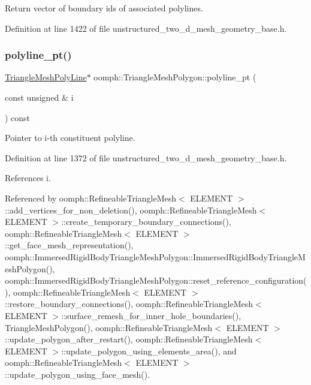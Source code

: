 Return vector of boundary ids of associated polylines. 



Definition at line 1422 of file unstructured\+\_\+two\+\_\+d\+\_\+mesh\+\_\+geometry\+\_\+base.\+h.

\mbox{\label{classoomph_1_1TriangleMeshPolygon_a528399d7e0fe0c8d684b4f851ca08dde}} 
\subsubsection{\texorpdfstring{polyline\+\_\+pt()}{polyline\_pt()}\hspace{0.1cm}{\footnotesize\ttfamily [1/2]}}
{\footnotesize\ttfamily \hyperlink{classoomph_1_1TriangleMeshPolyLine}{Triangle\+Mesh\+Poly\+Line}$\ast$ oomph\+::\+Triangle\+Mesh\+Polygon\+::polyline\+\_\+pt (\begin{DoxyParamCaption}\item[{const unsigned \&}]{i }\end{DoxyParamCaption}) const\hspace{0.3cm}{\ttfamily [inline]}}



Pointer to i-\/th constituent polyline. 



Definition at line 1372 of file unstructured\+\_\+two\+\_\+d\+\_\+mesh\+\_\+geometry\+\_\+base.\+h.



References i.



Referenced by oomph\+::\+Refineable\+Triangle\+Mesh$<$ E\+L\+E\+M\+E\+N\+T $>$\+::add\+\_\+vertices\+\_\+for\+\_\+non\+\_\+deletion(), oomph\+::\+Refineable\+Triangle\+Mesh$<$ E\+L\+E\+M\+E\+N\+T $>$\+::create\+\_\+temporary\+\_\+boundary\+\_\+connections(), oomph\+::\+Refineable\+Triangle\+Mesh$<$ E\+L\+E\+M\+E\+N\+T $>$\+::get\+\_\+face\+\_\+mesh\+\_\+representation(), oomph\+::\+Immersed\+Rigid\+Body\+Triangle\+Mesh\+Polygon\+::\+Immersed\+Rigid\+Body\+Triangle\+Mesh\+Polygon(), oomph\+::\+Immersed\+Rigid\+Body\+Triangle\+Mesh\+Polygon\+::reset\+\_\+reference\+\_\+configuration(), oomph\+::\+Refineable\+Triangle\+Mesh$<$ E\+L\+E\+M\+E\+N\+T $>$\+::restore\+\_\+boundary\+\_\+connections(), oomph\+::\+Refineable\+Triangle\+Mesh$<$ E\+L\+E\+M\+E\+N\+T $>$\+::surface\+\_\+remesh\+\_\+for\+\_\+inner\+\_\+hole\+\_\+boundaries(), Triangle\+Mesh\+Polygon(), oomph\+::\+Refineable\+Triangle\+Mesh$<$ E\+L\+E\+M\+E\+N\+T $>$\+::update\+\_\+polygon\+\_\+after\+\_\+restart(), oomph\+::\+Refineable\+Triangle\+Mesh$<$ E\+L\+E\+M\+E\+N\+T $>$\+::update\+\_\+polygon\+\_\+using\+\_\+elements\+\_\+area(), and oomph\+::\+Refineable\+Triangle\+Mesh$<$ E\+L\+E\+M\+E\+N\+T $>$\+::update\+\_\+polygon\+\_\+using\+\_\+face\+\_\+mesh().

